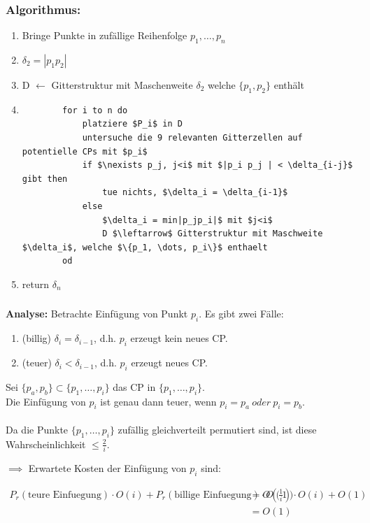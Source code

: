 \documentclass{article}
\begin{document}
\subsubsection{Algorithmus:}
\begin{enumerate}
    \item Bringe Punkte in zufällige Reihenfolge $p_1, \dots, p_n$
    \item $\delta_2 = |p_1 p_2|$
    \item D $\leftarrow$ Gitterstruktur mit Maschenweite $ \delta_2$ welche $\{p_1, p_2\}$ enthält
    \item 
    \begin{lstlisting}
        for i to n do
            platziere $P_i$ in D
            untersuche die 9 relevanten Gitterzellen auf potentielle CPs mit $p_i$
            if $\nexists p_j, j<i$ mit $|p_i p_j | < \delta_{i-j}$ gibt then
                tue nichts, $\delta_i = \delta_{i-1}$
            else 
                $\delta_i = min|p_jp_i|$ mit $j<i$
                D $\leftarrow$ Gitterstruktur mit Maschweite $\delta_i$, welche $\{p_1, \dots, p_i\}$ enthaelt
        od
    \end{lstlisting}
    \item return $\delta_n$
\end{enumerate}

\subsubsection{}
\textbf{Analyse:} Betrachte Einfügung von Punkt $p_i$. Es gibt zwei Fälle:
\begin{enumerate} [label=\Alph*.]
    \item (billig) $\delta_i = \delta_{i-1}$, d.h. $p_i$ erzeugt kein neues CP.
    \item (teuer) $\delta_i < \delta_{i-1}$, d.h. $p_i$ erzeugt neues CP. 
\end{enumerate}

Sei $\{p_a,p_b\} \subset \{p_1, \dots, p_i\} $ das  CP in $\{p_1, \dots, p_i\}$.\\
Die Einfügung von $p_i$ ist genau dann teuer, wenn $p_i = p_a\ oder\ p_i=p_b$.\\
\\
Da die Punkte $\{p_1, \dots, p_i\} $ zufällig gleichverteilt permutiert sind, ist diese Wahrscheinlichkeit $\leq \frac{2}{i}$.

$\implies$ Erwartete Kosten der Einfügung von $p_i$ sind:

\begin{align*}
    P_r(\text{teure Einfuegung}) \cdot O(i) + P_r(\text{billige Einfuegung}) \cdot O(1) &= O\left(\frac{1}{i}\right) \cdot O(i) + O(1) \\
    &= O(1)
\end{align*}
\end{document}
